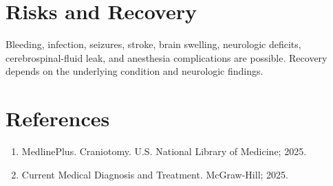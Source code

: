 \section*{Risks and Recovery}
Bleeding, infection, seizures, stroke, brain swelling, neurologic deficits, cerebrospinal-fluid leak, and anesthesia complications are possible. Recovery depends on the underlying condition and neurologic findings.
\section*{References}
\begin{enumerate}\item MedlinePlus. Craniotomy. U.S. National Library of Medicine; 2025.\item Current Medical Diagnosis and Treatment. McGraw-Hill; 2025.\end{enumerate}
\clearpage
